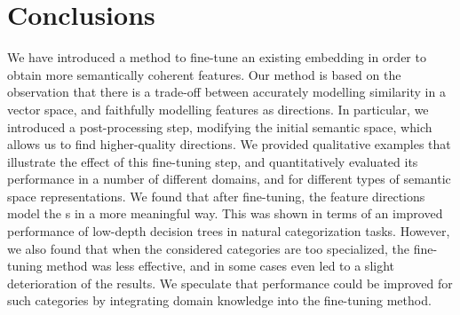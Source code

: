 \section{Conclusions}
We have introduced a method to fine-tune an existing  embedding in order to obtain more semantically coherent  features. Our method is based on the observation that there is a trade-off between accurately modelling similarity in a vector space, and faithfully modelling features as directions. In particular, we introduced a post-processing step, modifying the initial semantic space, which allows us to find higher-quality directions. We provided qualitative examples that illustrate the effect of this fine-tuning step, and quantitatively evaluated its performance in a number of different domains, and for different types of semantic space representations. We found that after fine-tuning, the feature directions model the s in a more meaningful way. This was shown in terms of an improved performance of low-depth decision trees in natural categorization tasks. However, we also found that when the considered categories are too specialized, the fine-tuning method was less effective, and in some cases even led to a slight deterioration of the results. We speculate that performance could be improved for such categories by integrating domain knowledge into the fine-tuning method. 








